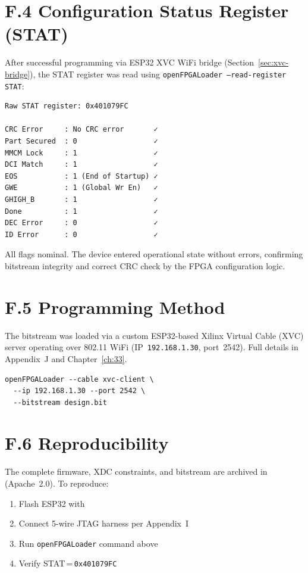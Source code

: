 \section*{F.4 Configuration Status Register (STAT)}

After successful programming via ESP32 XVC WiFi bridge
(Section~\ref{sec:xvc-bridge}), the STAT register was read using
\texttt{openFPGALoader --read-register STAT}:

\begin{verbatim}
Raw STAT register: 0x401079FC

CRC Error     : No CRC error       ✓
Part Secured  : 0                  ✓
MMCM Lock     : 1                  ✓
DCI Match     : 1                  ✓
EOS           : 1 (End of Startup) ✓
GWE           : 1 (Global Wr En)   ✓
GHIGH_B       : 1                  ✓
Done          : 1                  ✓
DEC Error     : 0                  ✓
ID Error      : 0                  ✓
\end{verbatim}

All flags nominal. The device entered operational state without errors,
confirming bitstream integrity and correct CRC check by the FPGA configuration
logic.

\section*{F.5 Programming Method}\label{sec:xvc-bridge}

The bitstream was loaded via a custom ESP32-based Xilinx Virtual Cable (XVC)
server operating over 802.11 WiFi (IP~\texttt{192.168.1.30}, port~2542).
Full details in Appendix~J and Chapter~\ref{ch:33}.

\begin{verbatim}
openFPGALoader --cable xvc-client \
  --ip 192.168.1.30 --port 2542 \
  --bitstream design.bit
\end{verbatim}

\section*{F.6 Reproducibility}

The complete firmware, XDC constraints, and bitstream are archived in
 (Apache~2.0). To reproduce:

\begin{enumerate}
  \item Flash ESP32 with 
  \item Connect 5-wire JTAG harness per Appendix~I
  \item Run \texttt{openFPGALoader} command above
  \item Verify STAT\,=\,\texttt{0x401079FC}
\end{enumerate}
